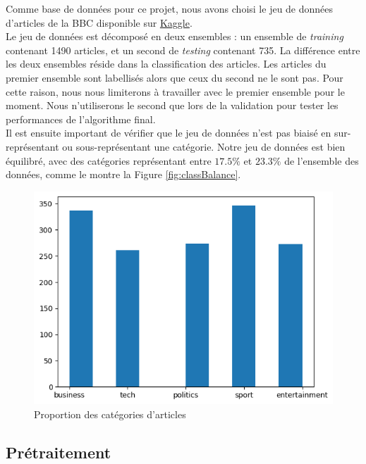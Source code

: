 \documentclass[a4paper,12pt]{article}
\begin{document}
Comme base de données pour ce projet, nous avons choisi le jeu de données d'articles de la BBC disponible sur \href{https://www.kaggle.com/c/learn-ai-bbc}{Kaggle}.\\

Le jeu de données est décomposé en deux ensembles : un ensemble de \textit{training} contenant 1490 articles, et un second de \textit{testing} contenant 735. La différence entre les deux ensembles réside dans la classification des articles. Les articles du premier ensemble sont labellisés alors que ceux du second ne le sont pas. Pour cette raison, nous nous limiterons à travailler avec le premier ensemble pour le moment. Nous n'utiliserons le second que lors de la validation pour tester les performances de l'algorithme final.\\

Il est ensuite important de vérifier que le jeu de données n'est pas biaisé en sur-représentant ou sous-représentant une catégorie. Notre jeu de données est bien équilibré, avec des catégories représentant entre $17.5\%$ et $23.3\%$ de l'ensemble des données, comme le montre la Figure \autoref{fig:classBalance}.

\begin{figure}[h]
  \centering
  \includegraphics{./images/class_balanced.png} %
  \caption{Proportion des catégories d'articles}
  \label{fig:classBalance}
\end{figure}

\subsection{Prétraitement}
\end{document}

